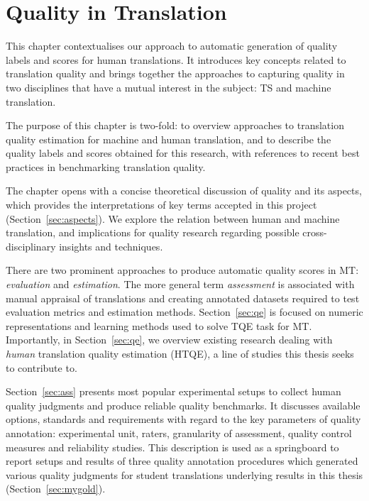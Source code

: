 \chapter{\label{cha:quest}Quality in Translation} %
This chapter contextualises our approach to automatic generation of quality labels and scores for human translations. It introduces key concepts related to translation quality and brings together the approaches to capturing quality in two disciplines that have a mutual interest in the subject: \gls{TS} and machine translation.

The purpose of this chapter is two-fold: to overview approaches to translation quality estimation for machine and human translation, and to describe the quality labels and scores obtained for this research, with references to recent best practices in benchmarking translation quality. 

The chapter opens with a concise theoretical discussion of quality and its aspects, which provides the interpretations of key terms accepted in this project (Section~\ref{sec:aspects}). We explore the relation between human and machine translation, and implications for quality research regarding possible cross-disciplinary insights and techniques.

There are two prominent approaches to produce automatic quality scores in MT: \textit{evaluation} and \textit{estimation}. The more general term \textit{assessment} is associated with manual appraisal of translations and creating annotated datasets required to test evaluation metrics and estimation methods. 
Section~\ref{sec:qe} is focused on numeric representations and learning methods used to solve \gls{TQE} task for MT. Importantly, in Section~\ref{sec:qe}, we overview existing research dealing with \textit{human} translation quality estimation (\gls{HTQE}), a line of studies this thesis seeks to contribute to. 

Section~\ref{sec:ass} presents most popular experimental setups to collect human quality judgments and produce reliable quality benchmarks. It discusses available options, standards and requirements with regard to the key parameters of quality annotation: experimental unit, raters, granularity of assessment, quality control measures and reliability studies. This description is used as a springboard to report setups and results of three quality annotation procedures which generated various quality judgments for student translations underlying results in this thesis (Section~\ref{sec:mygold}). 
 
